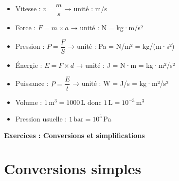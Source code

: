 \documentclass[11pt,a4paper]{article}
\newcommand{\rulebox}[3]{
\begin{tcolorbox}[colback=#1!10!white,colframe=#1!60!black,title=\textbf{#2}]
#3
\end{tcolorbox}
}
\begin{document}
\rulebox{orange}{Unités dérivées et usuelles}{
\begin{itemize}
\item Vitesse : $v = \dfrac{m}{s}$ → unité : m/s  
\item Force : $F = m \times a$ → unité : N = kg·m/s²  
\item Pression : $P = \dfrac{F}{S}$ → unité : Pa = N/m² = kg/(m·s²)
\item Énergie : $E = F \times d$ → unité : J = N·m = kg·m²/s²
\item Puissance : $P = \dfrac{E}{t}$ → unité : W = J/s = kg·m²/s³
\item Volume : $1\,\text{m}^3 = 1000\,\text{L}$ \quad donc $1\,\text{L} = 10^{-3}\,\text{m}^3$
\item Pression usuelle : $1\,\text{bar} = 10^5\,\text{Pa}$
\end{itemize}
}

\newpage
\begin{center}
{\LARGE \textbf{Exercices : Conversions et simplifications}}
\end{center}

\section*{Conversions simples}
\end{document}
